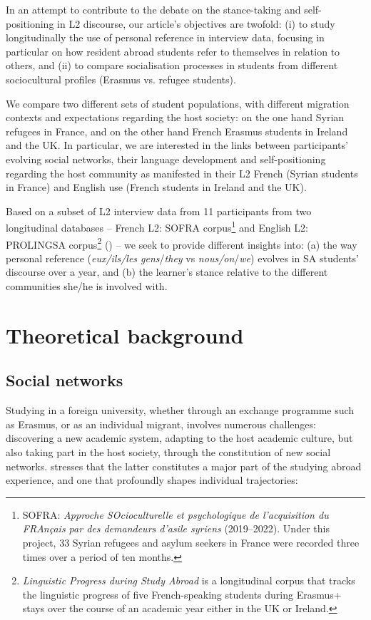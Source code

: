 \documentclass[output=paper]{langscibook}
\begin{document}
In an attempt to contribute to the debate on the stance-taking and self-po\-si\-tioning in L2 discourse, our article’s objectives are twofold: (i) to study longitudinally the use of personal reference in interview data, focusing in particular on how resident abroad students refer to themselves in relation to others, and (ii) to compare socialisation processes in students from different sociocultural profiles (Erasmus vs. refugee students).

We compare two different sets of student populations, with different migration contexts and expectations regarding the host society: on the one hand Syrian refugees in France, and on the other hand French Erasmus students in Ireland and the UK. In particular, we are interested in the links between participants’ evolving social networks, their language development and self-positioning regarding the host community as manifested in their L2 French (Syrian students in France) and English use (French students in Ireland and the UK).

Based on a subset of L2 interview data from 11 participants from two longitudinal databases -- French L2: SOFRA corpus\footnote{SOFRA: \textit{Approche SOcioculturelle et psychologique de l’acquisition du FRAnçais par des demandeurs d’asile syriens} (2019--2022). Under this project, 33 Syrian refugees and asylum seekers in France were recorded three times over a period of ten months.} and English L2: PROLINGSA corpus\footnote{\textit{Linguistic Progress during Study Abroad} is a longitudinal corpus that tracks the linguistic progress of five French-speaking students during Erasmus+ stays over the course of an academic year either in the UK or Ireland.} (\citealt{LeclercqEtAl2021}) -- we seek to provide different insights into: (a) the way personal reference (\textit{eux/ils/les gens}/\textit{they} vs \textit{nous/on}/\textit{we}) evolves in SA students’ discourse over a year, and (b) the learner’s stance relative to the different communities she/he is involved with.

\section{Theoretical background}
\subsection{Social networks} %

Studying in a foreign university, whether through an exchange programme such as Erasmus, or as an individual migrant, involves numerous challenges: discovering a new academic system, adapting to the host academic culture, but also taking part in the host society, through the constitution of new social networks. \citet{Coleman2015} stresses that the latter constitutes a major part of the studying abroad experience, and one that profoundly shapes individual trajectories:
\end{document}
